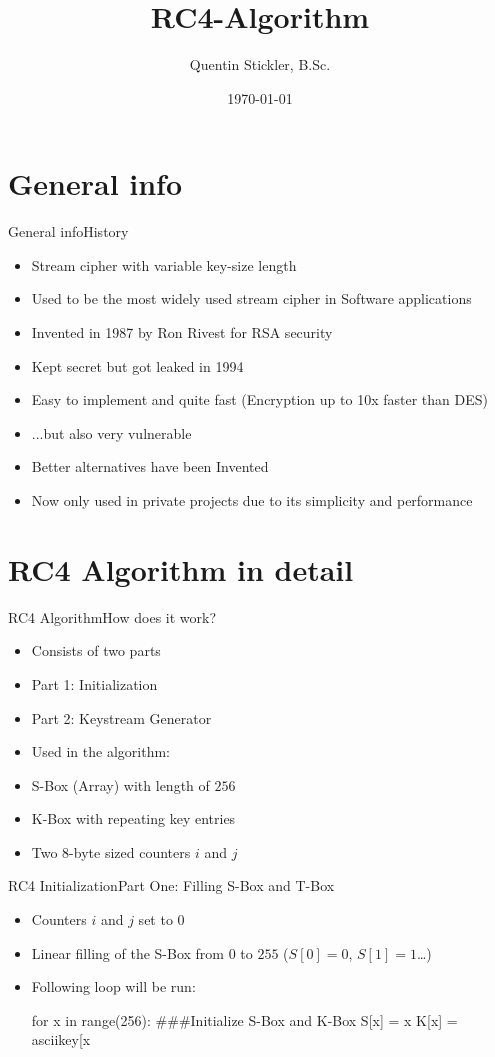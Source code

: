 \documentclass[
	aspectratio=169,	%
	onlytextwidth,		%
	t,					%
	]{beamer}
\title[RC4-Algorithm]{RC4-Algorithm}
\author[Quentin Stickler]{Quentin Stickler, B.Sc.}
\date{\today} %
\begin{document}
\section{General info}

\begin{frame}[fragile]{General info}{History}
	\begin{itemize}
		\item Stream cipher with variable key-size length
		\item Used to be the most widely used stream cipher in Software applications
		\item Invented in 1987 by Ron Rivest for RSA security
		\item Kept secret but got leaked in 1994
		\item Easy to implement and quite fast (Encryption up to 10x faster than DES)
		\item ...but also very vulnerable
		\item Better alternatives have been Invented
		\item Now only used in private projects due to its simplicity and performance
	\end{itemize}
\end{frame}

\section{RC4 Algorithm in detail}

\begin{frame}[fragile]{RC4 Algorithm}{How does it work?}
	\begin{itemize}
		\item Consists of two parts
		\item Part 1: Initialization
		\item Part 2: Keystream Generator
		\item Used in the algorithm:
		\item S-Box (Array) with length of $256$
		\item K-Box with repeating key entries
		\item Two 8-byte sized counters $i$ and $j$
	\end{itemize}
\end{frame}

\begin{frame}[fragile]{RC4 Initialization}{Part One: Filling S-Box and T-Box}
	\begin{itemize}
		\item Counters $i$ and $j$ set to $0$
		\item Linear filling of the S-Box from $0$ to $255$ ($S[0] = 0$, $S[1] = 1$\dots)
		\item Following loop will be run:

		\begin{python}
			for x in range(256):		###Initialize S-Box and K-Box
			S[x] = x
			K[x] = asciikey[x %
		\end{python}
		
	\end{itemize}
\end{frame}
\end{document}
